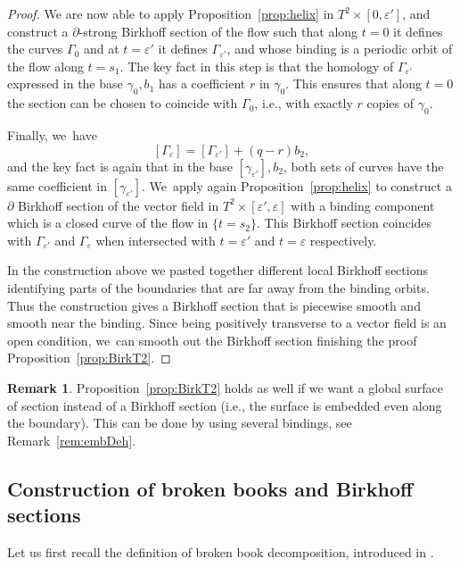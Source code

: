 \documentclass[11pt]{article}
\newcommand{\ie}{i.e.,\xspace}
\theoremstyle{definition}
\newtheorem{Remark}[theorem]{Remark}
\begin{document}
\begin{proof}
We are now able to apply Proposition~\ref{prop:helix} in $T^2\times [0,\varepsilon']$, and construct a $\partial$-strong Birkhoff section of the flow such that along $t=0$ it defines the curves $\Gamma_0$ and at $t=\varepsilon'$ it defines $\Gamma_{\varepsilon'}$, and whose binding is a periodic orbit of the flow along $t=s_1$. The key fact in this step is that the homology of $\Gamma_{\varepsilon'}$ expressed in the base $\gamma_0, b_1$ has a coefficient $r$ in $\gamma_0$. This ensures that along $t=0$ the section can be chosen to coincide with $\Gamma_0$, \ie with exactly $r$ copies of $\gamma_0$.

Finally, we~have
\[
[\Gamma_\varepsilon]= [\Gamma_{\varepsilon'}]+ (q-r)b_2,
\]
and the key fact is again that in the base $[\gamma_{\varepsilon'}], b_2$, both sets of curves have the same coefficient in $[\gamma_{\varepsilon'}]$. We~apply again Proposition~\ref{prop:helix} to construct a $\partial$ Birkhoff section of the vector field in $T^2\times [\varepsilon',\varepsilon]$ with a binding component which is a closed curve of the flow in $\{t=s_2\}$. This Birkhoff section coincides with $\Gamma_{\varepsilon'}$ and $\Gamma_{\varepsilon}$ when intersected with $t=\varepsilon'$ and $t=\varepsilon$ respectively.

In the construction above we pasted together different local Birkhoff sections identifying parts of the boundaries that are far away from the binding orbits. Thus the construction gives a Birkhoff section that is piecewise smooth and smooth near the binding. Since being positively transverse to a vector field is an open condition, we~can smooth out the Birkhoff section finishing the proof Proposition~\ref{prop:BirkT2}.
\end{proof}

\begin{Remark}
Proposition~\ref{prop:BirkT2} holds as well if we want a global surface of section instead of a Birkhoff section (\ie the surface is embedded even along the boundary). This can be done by using several bindings, see Remark~\ref{rem:embDeh}.
\end{Remark}

\subsection{Construction of broken books and Birkhoff sections} \label{sec:bbook}

Let us first recall the definition of broken book decomposition, introduced in \cite{CDR}.
\end{document}
